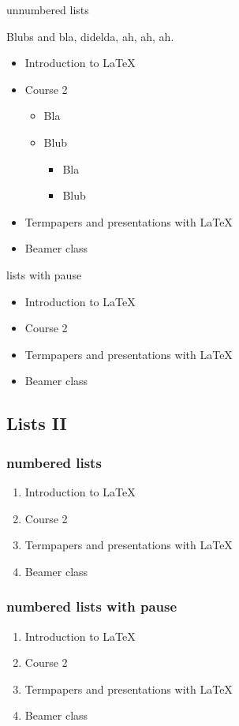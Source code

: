 \documentclass{beamer}
\begin{document}
\begin{frame}{unnumbered lists}

	Blubs and bla, didelda, ah, ah, ah.
	\begin{itemize}
		\item Introduction to  \LaTeX
		\item Course 2
		\begin{itemize}
			\item Bla
			\item Blub
			\begin{itemize}
				\item Bla
				\item Blub
			\end{itemize}
		\end{itemize}
		\item Termpapers and presentations with \LaTeX
	\item Beamer class
	\end{itemize}
\end{frame}

\begin{frame}{lists with pause}
	\begin{itemize}
		\item Introduction to  \LaTeX \pause
		\item Course 2 \pause
		\item Termpapers and presentations with \LaTeX \pause
		\item Beamer class
	\end{itemize}
\end{frame}

\subsection{Lists II}

\begin{frame}\frametitle{numbered lists}
	\begin{enumerate}
		\item Introduction to  \LaTeX
		\item Course 2
		\item Termpapers and presentations with \LaTeX
		\item Beamer class
	\end{enumerate}
\end{frame}

\begin{frame}\frametitle{numbered lists with pause}
	\begin{enumerate}
		\item Introduction to  \LaTeX \pause
		\item Course 2 \pause
		\item Termpapers and presentations with \LaTeX \pause
		\item Beamer class
	\end{enumerate}
\end{frame}
\end{document}
